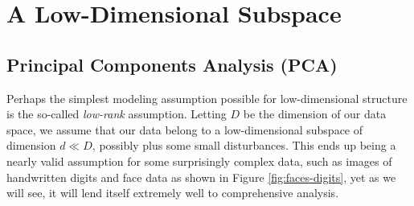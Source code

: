 \documentclass[../../book-main.tex]{subfiles}
\begin{document}







\section{A Low-Dimensional Subspace} \label{sec:lowrank}

\subsection{Principal Components Analysis (PCA)} \label{sub:pca}

Perhaps the simplest modeling assumption possible for low-dimensional structure
is the so-called \textit{low-rank} assumption. Letting \(D\) be the dimension of
our data space, we assume that our data belong to a low-dimensional subspace of dimension \(d \ll D\), possibly plus some small disturbances. This ends up being a nearly valid assumption for some surprisingly complex data, such as images of handwritten digits and face data \cite{BasriR2003-PAMI} as shown in Figure \ref{fig:faces-digits}, yet as we will see, it will lend itself extremely well to comprehensive analysis. 
\end{document}

